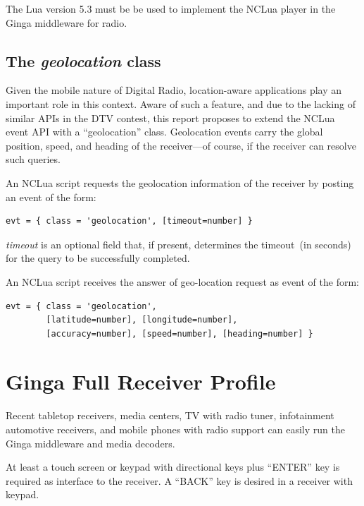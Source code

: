 \documentclass[11pt]{article}
\begin{document}
The Lua version 5.3 must be be used to implement the NCLua player in the
Ginga middleware for radio.

\subsection{The \emph{geolocation} class}
Given the mobile nature of Digital Radio, location-aware applications play an
important role in this context.
Aware of such a feature, and due to the lacking of similar APIs in the DTV
contest, this report proposes to extend the NCLua event API with a
``geolocation'' class. Geolocation events carry the global position, speed, and
heading of the receiver---of course, if the receiver can resolve such queries.

An NCLua script requests the geolocation information of the receiver by posting
an event of the form:

\begin{verbatim}
evt = { class = 'geolocation', [timeout=number] }
\end{verbatim}

\emph{timeout} is an optional field that, if present, determines the
timeout~(in seconds) for the query to be successfully completed.

An NCLua script receives the answer of geo-location request as event of the
form:

\begin{verbatim}
evt = { class = 'geolocation',
        [latitude=number], [longitude=number],
        [accuracy=number], [speed=number], [heading=number] }
\end{verbatim}



\section{Ginga Full Receiver Profile}
\label{sec:receiver_profile}

Recent tabletop receivers, media centers, TV with radio tuner, infotainment
automotive receivers, and mobile phones with radio support can easily run
the Ginga middleware and media decoders.

At least a touch screen or keypad with directional keys plus ``ENTER'' key
is required as interface to the receiver. A ``BACK'' key is desired in a
receiver with keypad.
\end{document}
